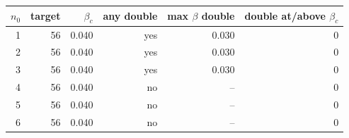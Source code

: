 \begin{tabular}{rrrrrr}
\toprule
$n_0$ & target & $\beta_c$ & any double & max $\beta$ double & double at/above $\beta_c$ \\
\midrule
1 & 56 & 0.040 & yes & 0.030 & 0 \\
2 & 56 & 0.040 & yes & 0.030 & 0 \\
3 & 56 & 0.040 & yes & 0.030 & 0 \\
4 & 56 & 0.040 & no & -- & 0 \\
5 & 56 & 0.040 & no & -- & 0 \\
6 & 56 & 0.040 & no & -- & 0 \\
\bottomrule
\end{tabular}
